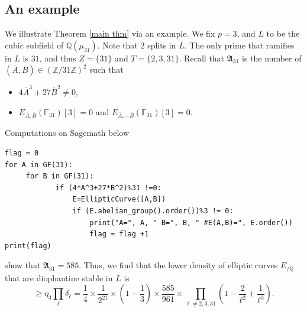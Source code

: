 \documentclass[12pt]{amsart}
\newcommand{\Z}{\mathbb{Z}}
\newcommand{\Q}{\mathbb{Q}}
\newcommand{\F}{\mathbb{F}}
\numberwithin{equation}{section}
\begin{document}
\subsection{An example}
We illustrate Theorem \ref{main thm} via an example. We fix $p=3$, and $L$ to be the cubic subfield of $\Q(\mu_{31})$. Note that $2$ splits in $L$. The only prime that ramifies in $L$ is $31$, and thus $Z=\{31\}$ and $T=\{2,3,31\}$. Recall that $\mathfrak{A}_{31}$ is the number of $(\overline{A}, \overline{B})\in (\Z/31\Z)^2$ such that
\begin{itemize}
\item $4 \overline{A}^3+27 \overline{B}^2\neq 0$, 
\item $E_{\overline{A}, \overline{B}}(\F_{31})[3]=0$ and $E_{\overline{A}, -\overline{B}}(\F_{31})[3]=0$.
\end{itemize}
Computations on Sagemath below
\begin{verbatim}
flag = 0
for A in GF(31):
     for B in GF(31):
            if (4*A^3+27*B^2)%31 !=0:
                E=EllipticCurve([A,B])
                if (E.abelian_group().order())%3 != 0:
                    print("A=", A, " B=", B, " #E(A,B)=", E.order())
                    flag = flag +1
print(flag)
\end{verbatim}
show that $\mathfrak{A}_{31}=585$.
Thus, we find that the lower density of elliptic curves $E_{/\Q}$ that are diophantine stable in $L$ is 
\[\geq \eta_3\prod_\ell \delta_\ell=\frac{1}{4} \times \frac{1}{2^{21}}\times \left(1-\frac{1}{3}\right)\times \frac{585}{961}\times \prod_{\ell\neq 2,3,31} \left(1-\frac{2}{\ell^2}+\frac{1}{\ell^3}\right).\]




\end{document}
